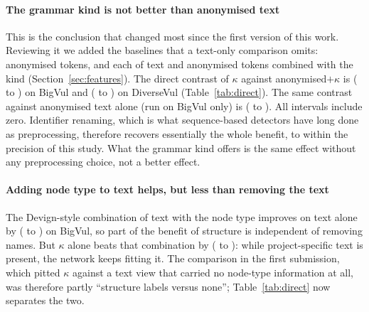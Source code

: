 \paragraph{The grammar kind is not better than anonymised text} This is the
conclusion that changed most since the first version of this work. Reviewing it
we added the baselines that a text-only comparison omits: anonymised tokens, and
each of text and anonymised tokens combined with the kind
(Section~\ref{sec:features}). The direct contrast of $\kappa$ against
anonymised$+\kappa$ is \cBvGgnnKindVAnonKindD{}
(\cBvGgnnKindVAnonKindLo{} to \cBvGgnnKindVAnonKindHi{}) on BigVul and
\cDvGgnnKindVAnonKindD{} (\cDvGgnnKindVAnonKindLo{} to
\cDvGgnnKindVAnonKindHi{}) on DiverseVul
(Table~\ref{tab:direct}). The same contrast against anonymised text alone (run on BigVul only) is
\cBvGgnnKindVAnonD{} (\cBvGgnnKindVAnonLo{} to \cBvGgnnKindVAnonHi{}). All
intervals include zero. Identifier renaming, which is what sequence-based
detectors have long done as preprocessing, therefore recovers essentially the
whole benefit, to within the precision of this study. What the grammar kind offers is the same effect without any
preprocessing choice, not a better effect.

\paragraph{Adding node type to text helps, but less than removing the text}
The Devign-style combination of text with the node type improves on text alone
by \cBvGgnnLexKindVLexD{} (\cBvGgnnLexKindVLexLo{} to
\cBvGgnnLexKindVLexHi{}) on BigVul, so part of the benefit of structure is
independent of removing names. But $\kappa$ alone beats that combination by
\cBvGgnnKindVLexKindD{} (\cBvGgnnKindVLexKindLo{} to
\cBvGgnnKindVLexKindHi{}): while project-specific text is present, the network
keeps fitting it. The comparison in the first submission, which pitted
$\kappa$ against a text view that carried no node-type information at all, was
therefore partly ``structure labels versus none''; Table~\ref{tab:direct} now
separates the two.

